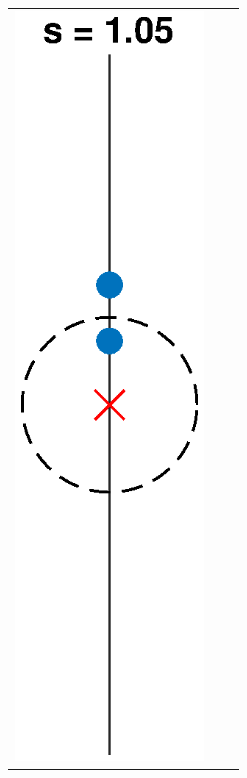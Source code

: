 \documentclass[thesis.tex]{subfiles}
\begin{document}
\begin{figure}
\begin{center}
\begin{tabular}{ccc}
\includegraphics[width=5cm]{images/kreinbubbles/bubble105R} &

\end{tabular}
\end{center}
\end{figure}
\end{document}
